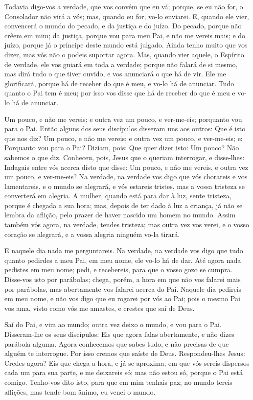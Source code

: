 Todavia digo-vos a verdade, que vos convém que eu vá; porque, se
eu não for, o Consolador não virá a vós; mas, quando eu for, vo-lo
enviarei. E, quando ele vier, convencerá o mundo do pecado, e da
justiça e do juízo. Do pecado, porque não crêem em mim;
da justiça, porque vou para meu Pai, e não me vereis mais;
e do juízo, porque já o príncipe deste mundo está julgado.
Ainda tenho muito que vos dizer, mas vós não o podeis
suportar agora. Mas, quando vier aquele, o Espírito de
verdade, ele vos guiará em toda a verdade; porque não falará de si
mesmo, mas dirá tudo o que tiver ouvido, e vos anunciará o que há de
vir. Ele me glorificará, porque há de receber do que é meu, e
vo-lo há de anunciar. Tudo quanto o Pai tem é meu; por isso
vos disse que há de receber do que é meu e vo-lo há de anunciar.

Um pouco, e não me vereis; e outra vez um pouco, e ver-me-eis;
porquanto vou para o Pai. Então alguns dos seus discípulos
disseram uns aos outros: Que é isto que nos diz? Um pouco, e não me
vereis; e outra vez um pouco, e ver-me-eis; e: Porquanto vou para o
Pai? Diziam, pois: Que quer dizer isto: Um pouco? Não sabemos
o que diz. Conheceu, pois, Jesus que o queriam interrogar, e
disse-lhes: Indagais entre vós acerca disto que disse: Um pouco, e
não me vereis, e outra vez um pouco, e ver-me-eis? Na
verdade, na verdade vos digo que vós chorareis e vos lamentareis, e
o mundo se alegrará, e vós estareis tristes, mas a vossa tristeza se
converterá em alegria. A mulher, quando está para dar à luz,
sente tristeza, porque é chegada a sua hora; mas, depois de ter dado
à luz a criança, já não se lembra da aflição, pelo prazer de haver
nascido um homem no mundo. Assim também vós agora, na
verdade, tendes tristeza; mas outra vez vos verei, e o vosso coração
se alegrará, e a vossa alegria ninguém vo-la tirará.

E naquele dia nada me perguntareis. Na verdade, na verdade vos
digo que tudo quanto pedirdes a meu Pai, em meu nome, ele vo-lo há
de dar. Até agora nada pedistes em meu nome; pedi, e
recebereis, para que o vosso gozo se cumpra. Disse-vos isto
por parábolas; chega, porém, a hora em que não vos falarei mais por
parábolas, mas abertamente vos falarei acerca do Pai. Naquele
dia pedireis em meu nome, e não vos digo que eu rogarei por vós ao
Pai; pois o mesmo Pai vos ama, visto como vós me amastes, e
crestes que saí de Deus.

Saí do Pai, e vim ao mundo; outra vez deixo o mundo, e vou para o
Pai. Disseram-lhe os seus discípulos: Eis que agora falas
abertamente, e não dizes parábola alguma. Agora conhecemos
que sabes tudo, e não precisas de que alguém te interrogue. Por isso
cremos que saíste de Deus. Respondeu-lhes Jesus: Credes
agora? Eis que chega a hora, e já se aproxima, em que vós
sereis dispersos cada um para sua parte, e me deixareis só; mas não
estou só, porque o Pai está comigo. Tenho-vos dito isto, para
que em mim tenhais paz; no mundo tereis aflições, mas tende bom
ânimo, eu venci o mundo.

